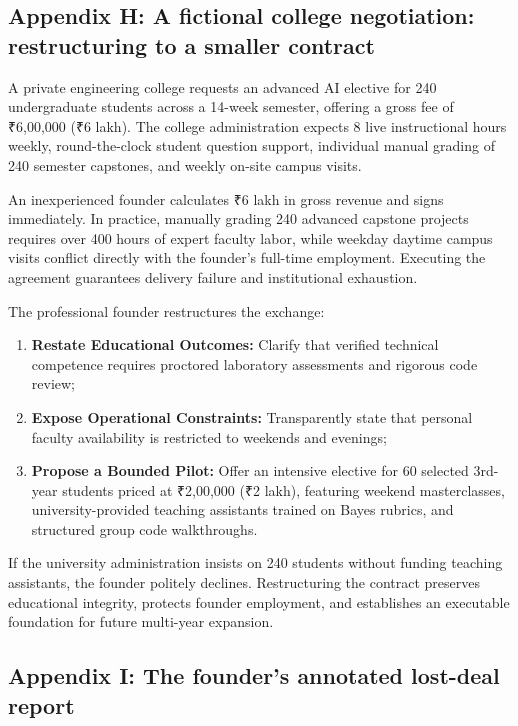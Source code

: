 \subsection*{Appendix H: A fictional college negotiation: restructuring to a smaller contract}

A private engineering college requests an advanced AI elective for 240 undergraduate students across a 14-week semester, offering a gross fee of ₹6,00,000 (₹6 lakh). The college administration expects 8 live instructional hours weekly, round-the-clock student question support, individual manual grading of 240 semester capstones, and weekly on-site campus visits.

An inexperienced founder calculates ₹6 lakh in gross revenue and signs immediately. In practice, manually grading 240 advanced capstone projects requires over 400 hours of expert faculty labor, while weekday daytime campus visits conflict directly with the founder's full-time employment. Executing the agreement guarantees delivery failure and institutional exhaustion.

The professional founder restructures the exchange:
\begin{enumerate}
\item \textbf{Restate Educational Outcomes:} Clarify that verified technical competence requires proctored laboratory assessments and rigorous code review;
\item \textbf{Expose Operational Constraints:} Transparently state that personal faculty availability is restricted to weekends and evenings;
\item \textbf{Propose a Bounded Pilot:} Offer an intensive elective for 60 selected 3rd-year students priced at ₹2,00,000 (₹2 lakh), featuring weekend masterclasses, university-provided teaching assistants trained on Bayes rubrics, and structured group code walkthroughs.
\end{enumerate}
If the university administration insists on 240 students without funding teaching assistants, the founder politely declines. Restructuring the contract preserves educational integrity, protects founder employment, and establishes an executable foundation for future multi-year expansion.

\subsection*{Appendix I: The founder's annotated lost-deal report}

